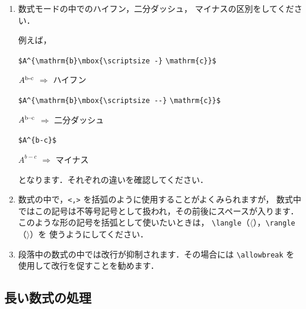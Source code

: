 \documentclass[technicalreport]{ieicej}
\begin{document}
\begin{enumerate}
\item
数式モードの中でのハイフン，二分ダッシュ，
マイナスの区別をしてください．

例えば，\par
\noindent
\verb/$A^{\mathrm{b}\mbox{\scriptsize -}/\hfil\break
 \verb/\mathrm{c}}$/\par
\noindent
\hspace{2zw}$A^{\mathrm{b}\mbox{\scriptsize -}\mathrm{c}}$
 $\Rightarrow$ ハイフン\par
\noindent
\verb/$A^{\mathrm{b}\mbox{\scriptsize --}/\hfil\break
 \verb/\mathrm{c}}$/\par
\noindent
\hspace{2zw}$A^{\mathrm{b}\mbox{\scriptsize --}\mathrm{c}}$
 $\Rightarrow$ 二分ダッシュ\par
\noindent
\verb/$A^{b-c}$/\par
\noindent
\hspace{2zw}$A^{b-c}$ $\Rightarrow$ マイナス\par
となります．それぞれの違いを確認してください．

\item
数式の中で，\verb/<,>/ を括弧のように使用することがよくみられますが，
数式中ではこの記号は不等号記号として扱われ，その前後にスペースが入ります．
このような形の記号を括弧として使いたいときは，
\verb/\langle/（$\langle$），\verb/\rangle/（$\rangle$）を
使うようにしてください．


\item
段落中の数式の中では改行が抑制されます．その場合には \verb/\allowbreak/ を
使用して改行を促すことを勧めます\cite{Abrahams}．
\end{enumerate}

\subsection{長い数式の処理}
\label{sec:equation2}
\end{document}
